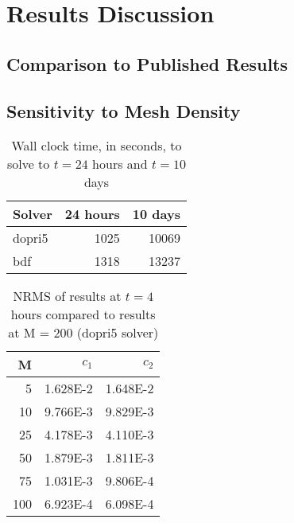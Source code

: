\documentclass[twocolumn,10pt]{asme2ej}
\begin{document}
\section{Results Discussion}

\subsection{Comparison to Published Results}
\subsection{Sensitivity to Mesh Density}

\begin{table}[tbh]
\begin{center}
\begin{tabular}{| l | r r |}
\hline
Solver & 24 hours & 10 days \\
\hline
dopri5 & 1025     & 10069   \\
bdf    & 1318     & 13237   \\
\hline
\end{tabular}
\caption{Wall clock time, in seconds, to solve to $t=24$ hours and $t=10$ days}
\label{run_time}
\end{center}
\end{table}

\begin{table}[tbh]
\begin{center}
\begin{tabular}{| r | r r |}
\hline
M & $c_{1}$ & $c_{2}$ \\
\hline
  5 & 1.628E-2 & 1.648E-2 \\
 10 & 9.766E-3 & 9.829E-3 \\
 25 & 4.178E-3 & 4.110E-3 \\
 50 & 1.879E-3 & 1.811E-3 \\
 75 & 1.031E-3 & 9.806E-4 \\
100 & 6.923E-4 & 6.098E-4 \\
\hline
\end{tabular}
\caption{NRMS of results at $t=4$ hours compared to results at M = 200 (dopri5 solver)}
\label{dopri5_nrms_table}
\end{center}
\end{table}
\end{document}
